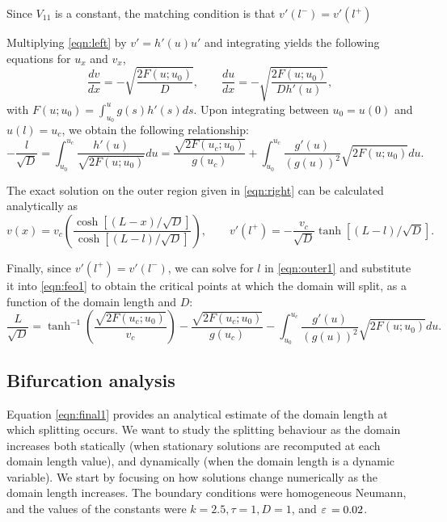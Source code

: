 Since $V_{11}$ is a constant, the matching condition is that $v'(l^-) = v'(l^+)$

Multiplying \eqref{eqn:left} by $v'=h'(u)u'$ and integrating yields the following equations for $u_x$ and $v_x$,
% 
\begin{equation*}
  \frac{dv}{dx} = -\sqrt{\frac{2F(u;u_0)}{D}},\qquad \frac{du}{dx} = -\sqrt{\frac{2F(u;u_0)}{Dh'(u)}},
\end{equation*}
% 
with $F(u;u_0) = \int_{u_0}^u g(s)h'(s)ds$. Upon integrating between $u_0=u(0)$ and $u(l)=u_c$, we obtain the following relationship:
% 
\begin{equation}
  \label{eqn:feo1}
  -\frac{l}{\sqrt{D}} = \int_{u_0}^{u_c}\frac{h'(u)}{\sqrt{2F(u;u_0)}}du = \frac{\sqrt{2F(u_c;u_0)}}{g(u_c)} + \int_{u_0}^{u_c}\frac{g'(u)}{(g(u))^2}\sqrt{2F(u;u_0)}du.
\end{equation}

The exact solution on the outer region given in \eqref{eqn:right} can be calculated analytically as 
% 
\begin{equation}
  \label{eqn:outer1}
  v(x) = v_c\left(\frac{\cosh\left[(L-x)/\sqrt{D}\right]}{\cosh\left[(L-l)/\sqrt{D}\right]}\right),\qquad v'(l^+)=-\frac{v_c}{\sqrt{D}}\tanh\left[(L-l)/\sqrt{D}\right].
\end{equation}

Finally, since $v'(l^+)=v'(l^-)$, we can solve for $l$ in \eqref{eqn:outer1} and substitute it into \eqref{eqn:feo1} to obtain the critical points at which the domain will split, as a function of the domain length and $D$:
% 
\begin{equation*}
  \label{eqn:final1}
  \frac{L}{\sqrt{D}}=\tanh^{-1}\left(\frac{\sqrt{2F(u_c;u_0)}}{v_c} \right) - \frac{\sqrt{2F(u_c;u_0)}}{g(u_c)} - \int_{u_0}^{u_c}\frac{g'(u)}{(g(u))^2}\sqrt{2F(u;u_0)}du.
\end{equation*}
% 

\subsection{Bifurcation analysis}

Equation \eqref{eqn:final1} provides an analytical estimate of the domain length at which splitting occurs. We want to study the splitting behaviour as the domain increases both statically (when stationary solutions are recomputed at each domain length value), and dynamically (when the domain length is a dynamic variable). We start by focusing on how solutions change numerically as the domain length increases. The boundary conditions were homogeneous Neumann, and the values of the constants were $k=2.5, \tau=1, D=1$, and $\varepsilon\,=0.02$. 

